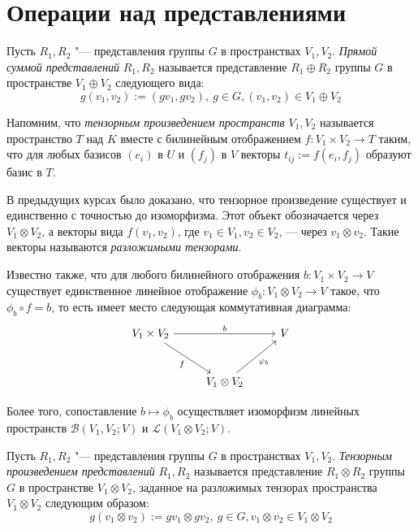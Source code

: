 \section{Операции над представлениями}

\begin{definition}
	Пусть $R_1, R_2$ "--- представления группы $G$ в пространствах $V_1, V_2$. \textit{Прямой суммой представлений} $R_1, R_2$ называется представление $R_1 \oplus R_2$ группы $G$ в пространстве $V_1 \oplus V_2$ следующего вида:
	\[g(v_1, v_2) := (gv_1, gv_2),~g \in G, (v_1, v_2) \in V_1 \oplus V_2\]
\end{definition}

\begin{note}
	Напомним, что \textit{тензорным произведением пространств $V_1, V_2$} называется пространство $T$ над $K$ вместе с билинейным отображением $f: V_1 \times V_2 \to T$ таким, что для любых базисов $(e_i)$ в $U$ и $(f_j)$ в $V$ векторы $t_{ij} := f({e_i}, {f_j})$ образуют базис в $T$.
	
	В предыдущих курсах было доказано, что тензорное произведение существует и единственно с точностью до изоморфизма. Этот объект обозначается через $V_1 \otimes V_2$, а векторы вида $f(v_1, v_2)$, где $v_1 \in V_1, v_2 \in V_2$, --- через $v_1 \otimes v_2$. Такие векторы называются \textit{разложимыми тензорами}.
	
	Известно также, что для любого билинейного отображения $b: V_1 \times V_2 \rightarrow V$ существует единственное линейное отображение $\phi_b: V_1 \otimes V_2 \rightarrow V$ такое, что $\phi_b \circ f = b$, то есть имеет место следующая коммутативная диаграмма:
	\[
	\begin{tikzcd}[row sep = large]
		V_1 \arrow[swap]{dr}{f} \times V_2 \arrow[]{rr}{b} && V\\
		& V_1 \otimes V_2 \arrow[swap]{ur}{\phi_b}&
	\end{tikzcd}
	\]
	
	Более того, сопоставление $b \mapsto \phi_b$ осуществляет изоморфизм линейных пространств $\mathcal{B}(V_1, V_2; V)$ и $\mathcal{L}(V_1 \otimes V_2; V)$.
\end{note}

\begin{definition}
	Пусть $R_1, R_2$ "--- представления группы $G$ в пространствах $V_1, V_2$. \textit{Тензорным произведением представлений} $R_1, R_2$ называется представление $R_1 \otimes R_2$ группы $G$ в пространстве $V_1 \otimes V_2$, заданное на разложимых тензорах пространства $V_1 \otimes V_2$ следующим образом:
	\[g(v_1 \otimes v_2) := gv_1 \otimes gv_2,~g \in G, v_1 \otimes v_2 \in V_1 \otimes V_2\]
\end{definition}

